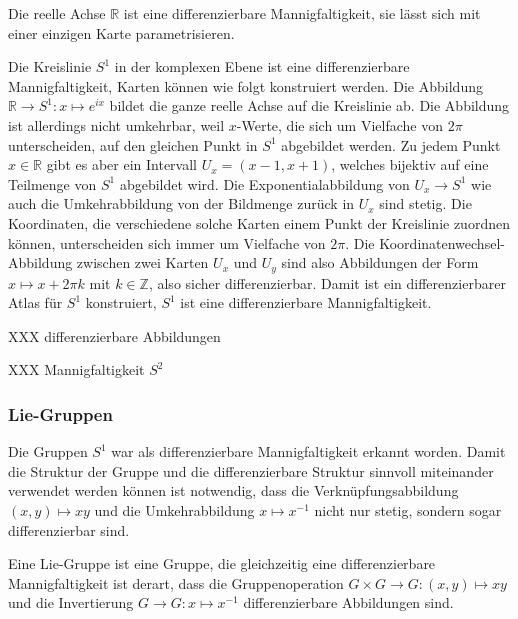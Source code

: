 \begin{beispiel}
Die reelle Achse $\mathbb{R}$ ist eine differenzierbare Mannigfaltigkeit,
sie lässt sich mit einer einzigen Karte parametrisieren.
\end{beispiel}

\begin{beispiel}
Die Kreislinie $S^1$ in der komplexen Ebene ist eine differenzierbare
Mannigfaltigkeit, Karten können wie folgt konstruiert werden.
Die Abbildung $\mathbb{R}\to S^1: x\mapsto e^{ix}$ bildet die ganze
reelle Achse auf die Kreislinie ab.
Die Abbildung ist allerdings nicht umkehrbar, weil $x$-Werte, die sich
um Vielfache von $2\pi$ unterscheiden, auf den gleichen Punkt in $S^1$
abgebildet werden.
Zu jedem Punkt $x\in\mathbb{R}$ gibt es aber ein Intervall
$U_x=(x-1,x+1)$, welches bijektiv auf eine Teilmenge von $S^1$
abgebildet wird.
Die Exponentialabbildung von $U_x\to S^1$ wie auch die Umkehrabbildung
von der Bildmenge zurück in $U_x$ sind stetig.
Die Koordinaten, die verschiedene solche Karten einem Punkt der Kreislinie
zuordnen können, unterscheiden sich immer um Vielfache von $2\pi$.
Die Koordinatenwechsel-Abbildung zwischen zwei Karten $U_x$ und $U_y$
sind also Abbildungen der Form $x\mapsto x+2\pi k$ mit $k\in\mathbb{Z}$,
also sicher differenzierbar.
Damit ist ein differenzierbarer Atlas für $S^1$ konstruiert, $S^1$
ist eine differenzierbare Mannigfaltigkeit.
\end{beispiel}

XXX differenzierbare Abbildungen

XXX Mannigfaltigkeit $S^2$

%
%
\subsubsection{Lie-Gruppen}
Die Gruppen $S^1$ war als differenzierbare Mannigfaltigkeit erkannt
worden.
Damit die Struktur der Gruppe und die differenzierbare Struktur sinnvoll
miteinander verwendet werden können ist notwendig, dass die
Verknüpfungsabbildung $(x,y)\mapsto xy$ und die Umkehrabbildung
$x\mapsto x^{-1}$ nicht nur stetig, sondern sogar differenzierbar sind.

\begin{definition}
Eine Lie-Gruppe ist eine Gruppe, die gleichzeitig eine differenzierbare
Mannigfaltigkeit ist derart, dass die Gruppenoperation
$G\times G\to G:(x,y)\mapsto xy$
und die Invertierung $G\to G: x\mapsto x^{-1}$ differenzierbare Abbildungen
sind.
\end{definition}

